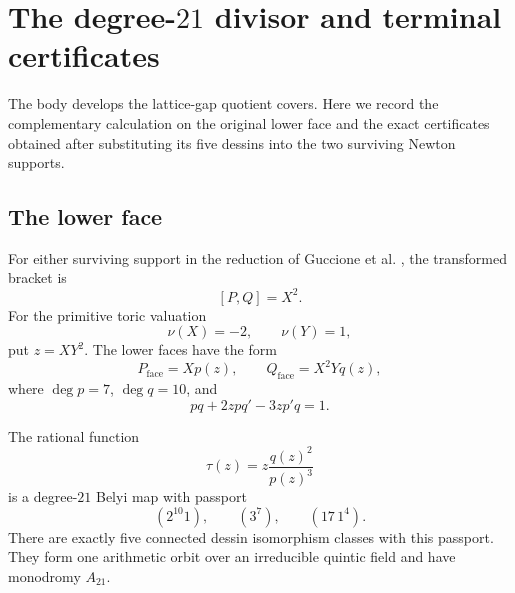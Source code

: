\section{The degree-\texorpdfstring{\(21\)}{21} divisor and terminal
  certificates}
\label{app:degree-twenty-one}

The body develops the lattice-gap quotient covers.  Here we record the
complementary calculation on the original lower face and the exact
certificates obtained after substituting its five dessins into the two
surviving Newton supports.

\subsection{The lower face}

For either surviving support in the reduction of Guccione et al.
\cite{guccioneEtAl2022degree108}, the transformed bracket is
\[
[P,Q]=X^2.
\]
For the primitive toric valuation
\[
\nu(X)=-2,\qquad \nu(Y)=1,
\]
put \(z=XY^2\).  The lower faces have the form
\[
P_{\mathrm{face}}=Xp(z),\qquad
Q_{\mathrm{face}}=X^2Yq(z),
\]
where \(\deg p=7\), \(\deg q=10\), and
\begin{equation}
\label{eq:degree21-face}
pq+2zpq'-3zp'q=1.
\end{equation}

\begin{proposition}
\label{prop:degree21-belyi}
The rational function
\[
\tau(z)=z\frac{q(z)^2}{p(z)^3}
\]
is a degree-\(21\) Belyi map with passport
\[
(2^{10}1),\qquad(3^7),\qquad(17\,1^4).
\]
There are exactly five connected dessin isomorphism classes with this
passport.  They form one arithmetic orbit over an irreducible quintic field
and have monodromy \(A_{21}\).
\end{proposition}

